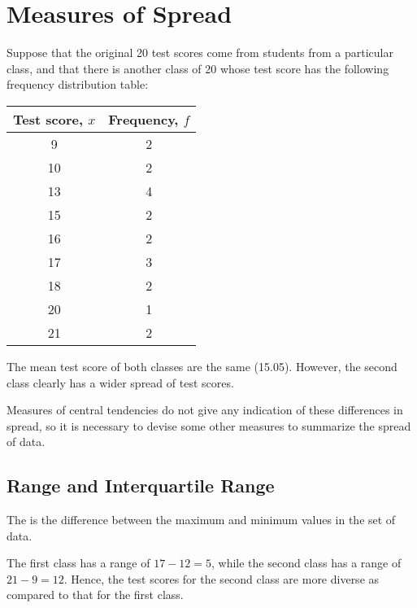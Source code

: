 \section{Measures of Spread}

Suppose that the original 20 test scores come from students from a particular class, and that there is another class of 20 whose test score has the following frequency distribution table:

\begin{center}
    \begin{tabular}{|c|c|}
    \hline
    \textbf{Test score, $x$} & \textbf{Frequency, $f$} \\ \hline\hline
    9 & 2 \\ \hline
    10 & 2 \\ \hline
    13 & 4 \\ \hline
    15 & 2 \\ \hline
    16 & 2 \\ \hline
    17 & 3 \\ \hline
    18 & 2 \\ \hline
    20 & 1 \\ \hline
    21 & 2 \\ \hline
    \end{tabular}
\end{center}

The mean test score of both classes are the same (15.05). However, the second class clearly has a wider spread of test scores.

Measures of central tendencies do not give any indication of these differences in spread, so it is necessary to devise some other measures to summarize the spread of data.

\subsection{Range and Interquartile Range}

\begin{definition}
    The  is the difference between the maximum and minimum values in the set of data.
\end{definition}

\begin{example}
    The first class has a range of $17 - 12 = 5$, while the second class has a range of $21 - 9 = 12$. Hence, the test scores for the second class are more diverse as compared to that for the first class.
\end{example}

